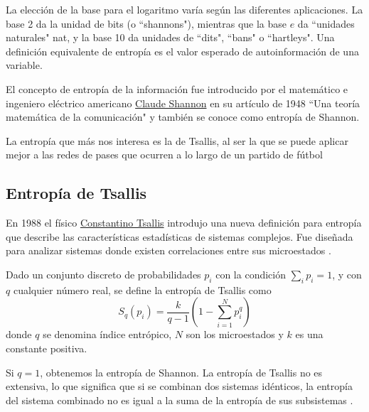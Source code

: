 La elección de la base para el logaritmo varía según las diferentes 
aplicaciones. La base 2 da la unidad de bits (o ``shannons"), mientras que la base $e$ da ``unidades naturales" 
nat, y la base 10 da unidades de ``dits", ``bans" o ``hartleys". Una definición equivalente de entropía es 
el valor esperado de autoinformación de una variable.

El concepto de entropía de la información fue introducido por el matemático e ingeniero eléctrico americano 
\href{https://en.wikipedia.org/wiki/Claude_Shannon}{Claude Shannon} en su artículo 
de 1948 ``Una teoría matemática de la comunicación" \cite{shannon-1948} y también se conoce como entropía de Shannon.

La entropía que más nos interesa es la de Tsallis, al ser la que se puede aplicar mejor a las redes de pases 
que ocurren a lo largo de un partido de fútbol
\subsection{Entropía de Tsallis}
En 1988 el físico \href{https://en.wikipedia.org/wiki/Constantino_Tsallis}{Constantino Tsallis} 
introdujo una nueva definición para entropía que describe las características estadísticas de sistemas 
complejos. Fue diseñada para analizar sistemas donde existen correlaciones entre sus microestados \cite{tsallis}.
\begin{definicion} \label{def:tsallis_entropy}
Dado un conjunto discreto de probabilidades ${p_i}$ con la condición $\sum_{i} p_i = 1$, y con $q$ 
cualquier número real, se define la entropía de Tsallis como
$$ S_q(p_i)=\frac{k}{q-1}\left(1- \sum_{i=1}^{N}p_{i}^{q}\right)$$
donde $q$ se denomina índice entrópico, $N$ son los microestados y $k$ es una constante positiva.
\end{definicion}
Si $q = 1$, obtenemos la entropía de 
Shannon. La entropía de Tsallis no es extensiva, lo que significa que si se combinan dos sistemas idénticos, 
la entropía del sistema combinado no es igual a la suma de la entropía de sus subsistemas \cite{comparison-entropies}.
